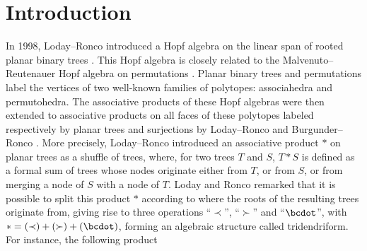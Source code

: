  \section{Introduction} \label{Intro-section}
In 1998, Loday--Ronco introduced a Hopf algebra on the linear 
span of rooted planar binary trees \cite{LR-planar-Hopf}. 
This Hopf algebra is closely related to the Malvenuto--
Reutenauer Hopf algebra on permutations \cite{MalvReut}. 
Planar binary trees and permutations label the vertices of 
two well-known families of  polytopes: associahedra and 
permutohedra. The associative products of these Hopf algebras 
were then extended to associative products on all faces of 
these polytopes labeled respectively by planar trees and 
surjections by Loday--Ronco \cite{LR02} and Burgunder--Ronco 
\cite{BR}. 
More precisely, Loday--Ronco introduced an associative product 
$\ast$ on planar trees as a shuffle of trees, where, for two trees $T$ and $S$,  
 $T \ast S$ is defined as a 
formal sum of trees whose nodes originate either from $T$, or 
from $S$, or from merging a node of $S$ with a node of $T$. 
Loday and Ronco remarked that it is possible to split this 
product $\ast$  according to where the roots of the resulting trees originate from, giving rise to three operations ``$\prec$'', ``$\succ$'' and ``$\bcdot$'', with $\ast=(\prec) + (\succ) +  (\bcdot)$, forming an algebraic structure called tridendriform. 
For instance, the following product
